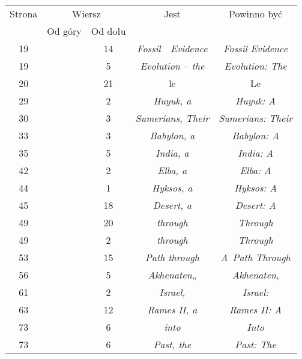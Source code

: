\documentclass[a4paper,11pt]{article}
\begin{document}
\begin{center}

  \begin{tabular}{|c|c|c|c|c|}
    \hline
    Strona & \multicolumn{2}{c|}{Wiersz} & Jest
                              & Powinno być \\ \cline{2-3}
    & Od góry & Od dołu & & \\
    \hline
    \hphantom{0}19 & & 14 & \textit{Fossil~~Evidence}
    & \textit{Fossil Evidence} \\
    \hphantom{0}19 & & \hphantom{0}5 & \textit{Evolution -- the}
    & \textit{Evolution: The} \\
    \hphantom{0}20 & & 21 & le & Le \\
    \hphantom{0}29 & & \hphantom{0}2 & \textit{Huyuk, a}
    & \textit{Huyuk: A} \\
    \hphantom{0}30 & & \hphantom{0}3 & \textit{Sumerians, Their}
    & \textit{Sumerians: Their} \\
    \hphantom{0}33 & & \hphantom{0}3 & \textit{Babylon, a}
    & \textit{Babylon: A} \\
    \hphantom{0}35 & & \hphantom{0}5 & \textit{India, a}
    & \textit{India: A} \\
    \hphantom{0}42 & & \hphantom{0}2 & \textit{Elba, a}
    & \textit{Elba: A} \\
    \hphantom{0}44 & & \hphantom{0}1 & \textit{Hyksos, a}
    & \textit{Hyksos: A} \\
    \hphantom{0}45 & & 18 & \textit{Desert, a} & \textit{Desert: A} \\
    \hphantom{0}49 & & 20 & \textit{through} & \textit{Through} \\
    \hphantom{0}49 & & \hphantom{0}2 & \textit{through}
    & \textit{Through} \\
    \hphantom{0}53 & & 15 & \textit{Path through}
    & \textit{A~Path Through} \\
    \hphantom{0}56 & & \hphantom{0}5 & \textit{Akhenaten}„
           & \textit{Akhenaten}, \\
    \hphantom{0}61 & & \hphantom{0}2 & \textit{Israel,}
    & \textit{Israel:} \\
    \hphantom{0}63 & & 12 & \textit{Rames II, a} & \textit{Rames II: A} \\
    \hphantom{0}73 & & \hphantom{0}6 & \textit{into} & \textit{Into} \\
    \hphantom{0}73 & & \hphantom{0}6 & \textit{Past, the}
    & \textit{Past: The} \\

\end{tabular}
\end{center}
\end{document}
